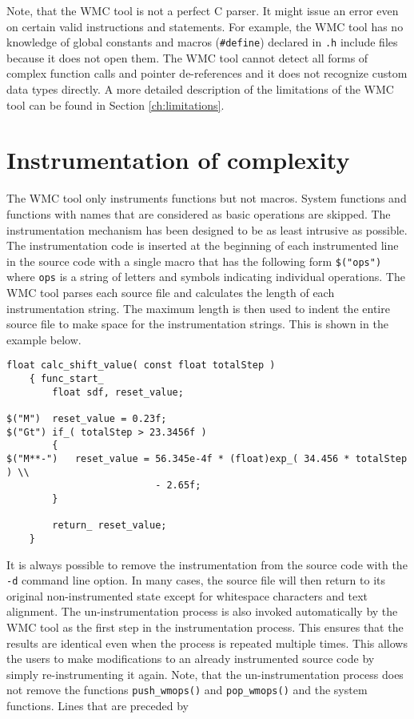 Note, that the WMC tool is not a perfect C parser. It might issue an error even on certain valid instructions and statements. For example, the WMC tool has no knowledge of global constants and macros (\verb|#define|) declared in \verb|.h| include files because it does not open them. The WMC tool cannot detect all forms of complex function calls and pointer de-references and it does not recognize custom data types directly. A more detailed description of the limitations of the WMC tool can be found in Section \ref{ch:limitations}.

\section{Instrumentation of complexity}
\label{ch:instrumentation_of_complexity}

The WMC tool only instruments functions but not macros. System functions and functions with names that are considered as basic operations are skipped. The instrumentation mechanism has been designed to be as least intrusive as possible. The instrumentation code is inserted at the beginning of each instrumented line in the source code with a single macro that has the following form \verb|$("ops")| where \verb|ops| is a string of letters and symbols indicating individual operations. The WMC tool parses each source file and calculates the length of each instrumentation string. The maximum length is then used to indent the entire source file to make space for the instrumentation strings. This is shown in the example below.

\begin{Verbatim}[fontsize=\small]
    float calc_shift_value( const float totalStep )
    { func_start_
        float sdf, reset_value;

$("M")  reset_value = 0.23f;
$("Gt") if_( totalStep > 23.3456f )
        {
$("M**-")   reset_value = 56.345e-4f * (float)exp_( 34.456 * totalStep ) \\
                          - 2.65f;
        }

        return_ reset_value;
    }
\end{Verbatim}

It is always possible to remove the instrumentation from the source code with the \verb|-d| command line option. In many cases, the source file will then return to its original non-instrumented state except for whitespace characters and text alignment. The un-instrumentation process is also invoked automatically by the WMC tool as the first step in the instrumentation process. This ensures that the results are identical even when the process is repeated multiple times. This allows the users to make modifications to an already instrumented source code by simply re-instrumenting it again. Note, that the un-instrumentation process does not remove the functions \verb|push_wmops()| and \verb|pop_wmops()| and the system functions. Lines that are preceded by

